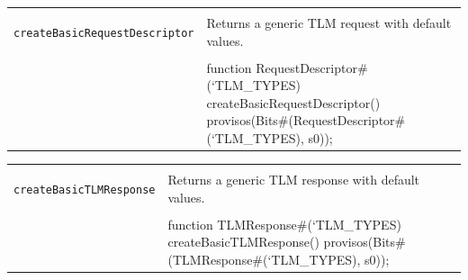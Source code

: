 \documentclass[twoside,letterpaper]{article}
\newcommand{\te}[1]{\texttt{#1}}
\newenvironment{libverbatim}
  {\vspace*{-1.0em}
   \verbatim}
  {\endverbatim
  }
\begin{document}
    


\begin{center}
\begin{tabular}{|p{2 in}|p{4.2 in}|}
\hline 
&\\
\te{createBasicRequestDescriptor}&Returns a generic TLM request
with default values. \\ 
&\\
\cline{2-2}
&\begin{libverbatim}
function RequestDescriptor#(`TLM_TYPES) 
         createBasicRequestDescriptor()
   provisos(Bits#(RequestDescriptor#(`TLM_TYPES), s0));
\end{libverbatim}
\\
\hline
\end{tabular}
\end{center}


\begin{center}
\begin{tabular}{|p{1.6 in}|p{4.6 in}|}
\hline 
&\\
\te{createBasicTLMResponse}& Returns a generic TLM response
with default values.\\ 
&\\
\cline{2-2}
&\begin{libverbatim}
function TLMResponse#(`TLM_TYPES) createBasicTLMResponse()
   provisos(Bits#(TLMResponse#(`TLM_TYPES), s0));
\end{libverbatim}
\\
\hline
\end{tabular}
\end{center}
\end{document}
